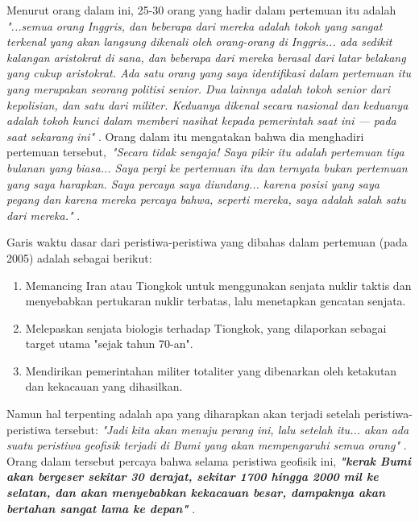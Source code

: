 \documentclass[10pt,twocolumn,letterpaper]{article}
\begin{document}
Menurut orang dalam ini, 25-30 orang yang hadir dalam pertemuan itu adalah \textit{"...semua orang Inggris, dan beberapa dari mereka adalah tokoh yang sangat terkenal yang akan langsung dikenali oleh orang-orang di Inggris... ada sedikit kalangan aristokrat di sana, dan beberapa dari mereka berasal dari latar belakang yang cukup aristokrat. Ada satu orang yang saya identifikasi dalam pertemuan itu yang merupakan seorang politisi senior. Dua lainnya adalah tokoh senior dari kepolisian, dan satu dari militer. Keduanya dikenal secara nasional dan keduanya adalah tokoh kunci dalam memberi nasihat kepada pemerintah saat ini — pada saat sekarang ini"} \cite{4}. Orang dalam itu mengatakan bahwa dia menghadiri pertemuan tersebut,\ \textit{"Secara tidak sengaja! Saya pikir itu adalah pertemuan tiga bulanan yang biasa... Saya pergi ke pertemuan itu dan ternyata bukan pertemuan yang saya harapkan. Saya percaya saya diundang... karena posisi yang saya pegang dan karena mereka percaya bahwa, seperti mereka, saya adalah salah satu dari mereka."} \cite{4}.

Garis waktu dasar dari peristiwa-peristiwa yang dibahas dalam pertemuan (pada 2005) adalah sebagai berikut:
\begin{flushleft}
\begin{enumerate}
    \item Memancing Iran atau Tiongkok untuk menggunakan senjata nuklir taktis dan menyebabkan pertukaran nuklir terbatas, lalu menetapkan gencatan senjata.
    \item Melepaskan senjata biologis terhadap Tiongkok, yang dilaporkan sebagai target utama "sejak tahun 70-an".
    \item Mendirikan pemerintahan militer totaliter yang dibenarkan oleh ketakutan dan kekacauan yang dihasilkan.
\end{enumerate}
\end{flushleft}

Namun hal terpenting adalah apa yang diharapkan akan terjadi setelah peristiwa-peristiwa tersebut: \textit{"Jadi kita akan menuju perang ini, lalu setelah itu... akan ada suatu peristiwa geofisik terjadi di Bumi yang akan mempengaruhi semua orang"} \cite{4}. Orang dalam tersebut percaya bahwa selama peristiwa geofisik ini, \textit{\textbf{"kerak Bumi akan bergeser sekitar 30 derajat, sekitar 1700 hingga 2000 mil ke selatan, dan akan menyebabkan kekacauan besar, dampaknya akan bertahan sangat lama ke depan"}} \cite{4}.
\end{document}

